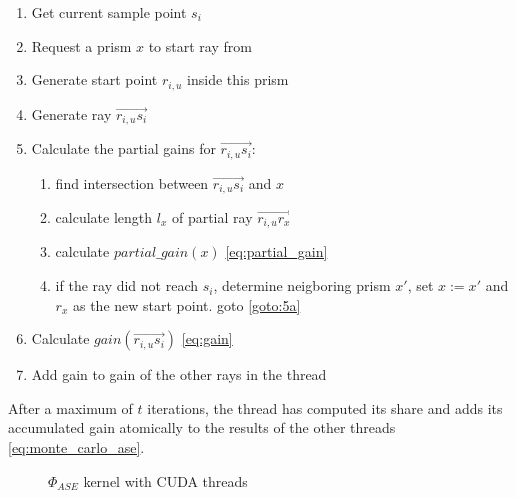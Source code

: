     \begin{enumerate}
      \item Get current sample point $s_i$
      \item Request a prism $x$ to start ray from
      \item Generate start point $r_{i,u}$ inside this prism 
      \item Generate ray $\overrightarrow{r_{i,u}s_i}$
      \item Calculate the partial gains for $\overrightarrow{r_{i,u}s_i}$:
        \begin{enumerate}
          \item find intersection between $\overrightarrow{r_{i,u}s_i}$
            and $x$\label{goto:5a}
          \item calculate length $l_x$ of partial ray $\overrightarrow{r_{i,u}r_x}$
          \item calculate $partial\_gain(x)$ \eqref{eq:partial_gain}
          \item if the ray did not reach $s_i$, determine neigboring prism $x'$,
            set $x := x'$ and $r_x$ as the new start point. goto \ref{goto:5a} 
        \end{enumerate}
      \item Calculate $gain(\overrightarrow{r_{i,u}s_i})$ \eqref{eq:gain}
      \item Add gain to gain of the other rays in the thread
    \end{enumerate}
    After a maximum of $t$ iterations, the thread has computed its share and
    adds its accumulated gain atomically to the results of the other threads
    \eqref{eq:monte_carlo_ase}.

\begin{figure}[H]
  \centerline
  {}
  \caption{$\Phi_{ASE}$ kernel with CUDA threads}
  \label{graphic:kernel}
\end{figure}


